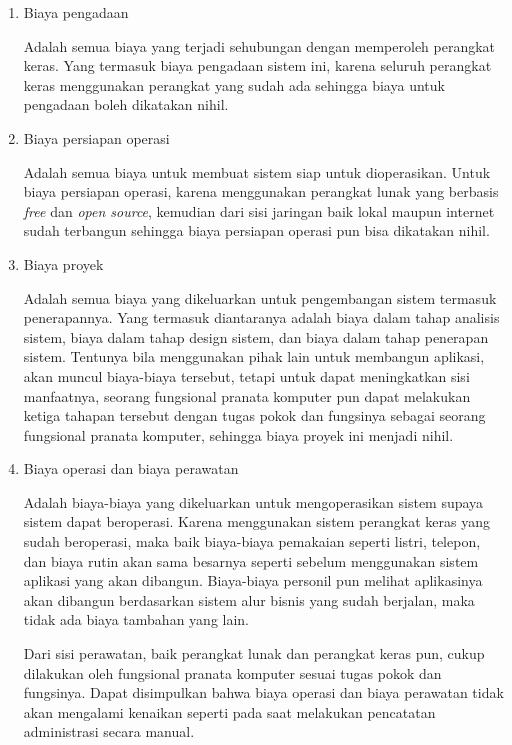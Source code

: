 \documentclass[pdftex,12pt, oneside]{article}
\begin{document}
\begin{enumerate}[1.]
  \item Biaya pengadaan

Adalah semua biaya yang terjadi sehubungan dengan memperoleh perangkat keras. Yang termasuk biaya pengadaan sistem ini, karena seluruh perangkat keras menggunakan perangkat yang sudah ada sehingga biaya untuk pengadaan boleh dikatakan nihil.
  
  \item Biaya persiapan operasi
  
Adalah semua biaya untuk membuat sistem siap untuk dioperasikan. Untuk biaya persiapan operasi, karena menggunakan perangkat lunak yang berbasis \textit{free} dan \textit{open source}, kemudian dari sisi jaringan baik lokal maupun internet sudah terbangun sehingga biaya persiapan operasi pun bisa dikatakan nihil.

  \item Biaya proyek

Adalah semua biaya yang dikeluarkan untuk pengembangan sistem termasuk penerapannya. Yang termasuk diantaranya adalah biaya dalam tahap analisis sistem, biaya dalam tahap design sistem, dan biaya dalam tahap penerapan sistem. Tentunya bila menggunakan pihak lain untuk membangun aplikasi, akan muncul biaya-biaya tersebut, tetapi untuk dapat meningkatkan sisi manfaatnya, seorang fungsional pranata komputer pun dapat melakukan ketiga tahapan tersebut dengan tugas pokok dan fungsinya sebagai seorang fungsional pranata komputer, sehingga biaya proyek ini menjadi nihil.
  
  \item Biaya operasi dan biaya perawatan 
  
Adalah biaya-biaya yang dikeluarkan untuk mengoperasikan sistem supaya sistem dapat beroperasi. Karena menggunakan sistem perangkat keras yang sudah beroperasi, maka baik biaya-biaya pemakaian seperti listri, telepon, dan biaya rutin akan sama besarnya seperti sebelum menggunakan sistem aplikasi yang akan dibangun. Biaya-biaya personil pun melihat aplikasinya akan dibangun berdasarkan sistem alur bisnis yang sudah berjalan, maka tidak ada biaya tambahan yang lain. 

Dari sisi perawatan, baik perangkat lunak dan perangkat keras pun, cukup dilakukan oleh fungsional pranata komputer sesuai tugas pokok dan fungsinya. Dapat disimpulkan bahwa biaya operasi dan biaya perawatan tidak akan mengalami kenaikan seperti pada saat melakukan pencatatan administrasi secara manual.

\end{enumerate}
\end{document}
